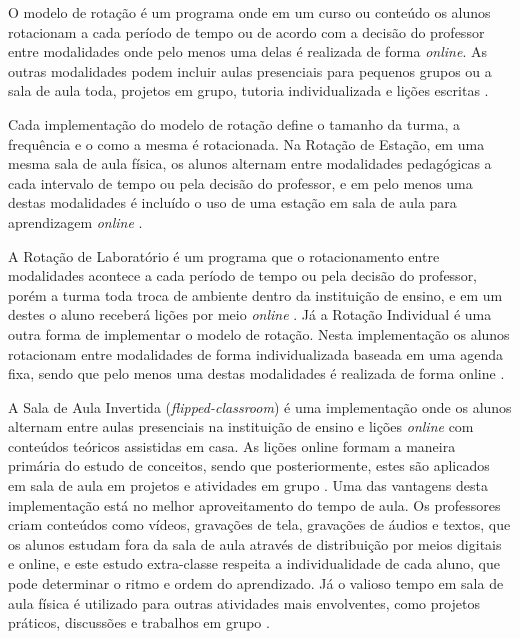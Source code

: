 
O modelo de rotação é um programa onde em um curso ou conteúdo os alunos rotacionam a cada período de tempo ou de acordo com a decisão do professor entre modalidades onde pelo menos uma delas é realizada de forma \emph{online}. As outras modalidades podem incluir aulas presenciais para pequenos grupos ou a sala de aula toda, projetos em grupo, tutoria individualizada e lições escritas \cite{staker_classifying_2012}.

Cada implementação do modelo de rotação define o tamanho da turma, a frequência e o como a mesma é rotacionada. Na Rotação de Estação, em uma mesma sala de aula física, os alunos alternam entre modalidades pedagógicas a cada intervalo de tempo ou pela decisão do professor, e em pelo menos uma destas modalidades é incluído o uso de uma estação em sala de aula para aprendizagem \emph{online} \cite{staker_classifying_2012}.

A Rotação de Laboratório é um programa que o rotacionamento entre modalidades acontece a cada período de tempo ou pela decisão do professor, porém a turma toda troca de ambiente dentro da instituição de ensino, e em um destes o aluno receberá lições por meio \emph{online} \cite{staker_classifying_2012}. Já a Rotação Individual é uma outra forma de implementar o modelo de rotação. Nesta implementação os alunos rotacionam entre modalidades de forma individualizada baseada em uma agenda fixa, sendo que pelo menos uma destas modalidades é realizada de forma online \cite{staker_classifying_2012}.

A Sala de Aula Invertida (\emph{flipped-classroom}) é uma implementação onde os alunos alternam entre aulas presenciais na instituição de ensino e lições \emph{online} com conteúdos teóricos assistidas em casa. As lições online formam a maneira primária do estudo de conceitos, sendo que posteriormente, estes são aplicados em sala de aula em projetos e atividades em grupo \cite{staker_classifying_2012}. Uma das vantagens desta implementação está no melhor aproveitamento do tempo de aula. Os professores criam conteúdos como vídeos, gravações de tela, gravações de áudios e textos, que os alunos estudam fora da sala de aula através de distribuição por meios digitais e online, e este estudo extra-classe respeita a individualidade de cada aluno, que pode determinar o ritmo e ordem do aprendizado. Já o valioso tempo em sala de aula física é utilizado para outras atividades mais envolventes, como projetos práticos, discussões e trabalhos em grupo \cite{milman_flipped_2012}.

